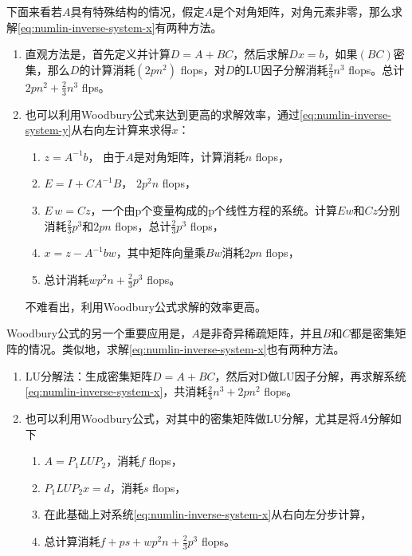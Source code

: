 \begin{subappendices}
下面来看若$A$具有特殊结构的情况，假定$A$是个对角矩阵，对角元素非零，那么求解\eqref{eq:numlin-inverse-system-x}有两种方法。
\begin{enumerate}
  \item 直观方法是，首先定义并计算$D = A + B C$，然后求解$D x = b$，如果$\left( B C \right)$密集，那么$D$的计算消耗$\left( 2 p n^{2} \right)$ flops，对$D$的LU因子分解消耗$\frac{2}{3} n^{3}$ flops。总计$2 p n^{2} + \frac{2}{3} n^{3}$ flps。
  \item 也可以利用Woodbury公式来达到更高的求解效率，通过\eqref{eq:numlin-inverse-system-y}从右向左计算来求得$x$：
  \begin{enumerate}
    \item $z= A^{-1} b $， 由于$A$是对角矩阵，计算消耗$n$ flops，
    \item $E = I + C A^{-1} B$， $2 p^{2} n$ flops，
    \item $E \, w = C z$，一个由p个变量构成的p个线性方程的系统。计算$E w$和$C z$分别消耗$\frac{2}{3} p^{3}$和$2 p n$ flops，总计$\frac{2}{3} p^{3}$ flops，
    \item $x = z - A^{-1} b w$，其中矩阵向量乘$Bw$消耗$2 pn$ flops，
    \item 总计消耗$w p^{2} n + \frac{2}{3} p^{3}$ flops。
  \end{enumerate}

  不难看出，利用Woodbury公式求解的效率更高。
\end{enumerate}

Woodbury公式的另一个重要应用是，$A$是非奇异稀疏矩阵，并且$B$和$C$都是密集矩阵的情况。类似地，求解\eqref{eq:numlin-inverse-system-x}也有两种方法。
\begin{enumerate}
  \item LU分解法：生成密集矩阵$D=A+BC$，然后对D做LU因子分解，再求解系统\eqref{eq:numlin-inverse-system-x}，共消耗$\frac{2}{3} n^{3} + 2 p n^{2}$ flops。
  \item 也可以利用Woodbury公式，对其中的密集矩阵做LU分解，尤其是将$A$分解如下
  \begin{enumerate}
    \item $A = P_{1} L U P_{2}$，消耗$f$ flops，
    \item $P_{1} L U P_{2} x = d$，消耗$s$ flops，
    \item 在此基础上对系统\eqref{eq:numlin-inverse-system-x}从右向左分步计算，
    \item 总计算消耗$f + ps + w p^{2} n + \frac{2}{3} p^{3}$ flops。
  \end{enumerate}


\end{enumerate}
\end{subappendices}
